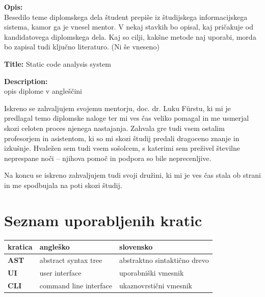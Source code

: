\documentclass[a4paper,12pt,openright]{book}
\newcommand{\clearemptydoublepage}{\newpage{\pagestyle{empty}\cleardoublepage}}
\begin{document}
\bigskip
\noindent\textbf{Opis:}\\
Besedilo teme diplomskega dela študent prepiše iz študijskega informacijskega sistema, kamor ga je vnesel mentor. 
V nekaj stavkih bo opisal, kaj pričakuje od kandidatovega diplomskega dela. 
Kaj so cilji, kakšne metode naj uporabi, morda bo zapisal tudi ključno literaturo. (Ni še vneseno)

\bigskip
\noindent\textbf{Title:} Static code analysis system

\bigskip
\noindent\textbf{Description:}\\
opis diplome v angleščini

\vfill



\vspace{2cm}

\clearemptydoublepage

\thispagestyle{empty}\mbox{}\vfill\null\it%
\noindent

Iskreno se zahvaljujem svojemu mentorju, doc. dr. Luku Fürstu, ki mi je predlagal temo diplomske naloge ter mi ves čas veliko pomagal in me usmerjal skozi celoten proces njenega nastajanja. Zahvala gre tudi vsem ostalim profesorjem in asistentom, ki so mi skozi študij predali dragoceno znanje in izkušnje. Hvaležen sem tudi vsem sošolcem, s katerimi sem preživel številne neprespane noči – njihova pomoč in podpora so bile neprecenljive.

Na koncu se iskreno zahvaljujem tudi svoji družini, ki mi je ves čas stala ob strani in me spodbujala na poti skozi študij.

\rm\normalfont

\clearemptydoublepage


\pagestyle{empty}
\def\thepage{}%
\tableofcontents{}


\clearemptydoublepage


\chapter*{Seznam uporabljenih kratic}

\noindent\begin{tabular}{p{}|p{}|p{}}    %
  {\bf kratica} & {\bf angleško}                              & {\bf slovensko} \\ \hline
  {\bf AST}      & abstract syntax tree               & abstraktno sintaktično drevo \\
  {\bf UI}      & user interface                              & uporabniški vmesnik \\
  {\bf CLI}     & command line interface                      & ukaznovrstični vmesnik \\
\end{tabular}
\end{document}
